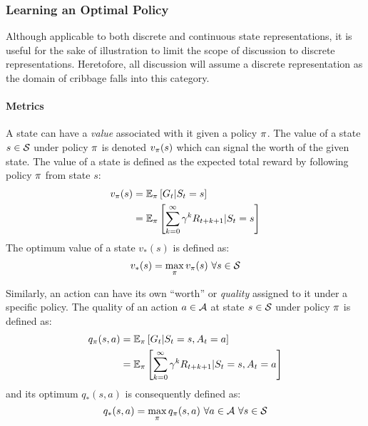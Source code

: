 \subsubsection*{Learning an Optimal Policy}


%
Although applicable to both discrete and continuous state representations,
it is useful for the sake of illustration to limit the scope of discussion to
discrete representations.
%
Heretofore, %
all discussion will assume a discrete representation
as the domain of cribbage falls into this category.

\paragraph*{Metrics}


A state can have a \textit{value} associated with it given a policy $\pi$.
%
The value of a state $s \in \mathcal{S}$ under policy $\pi$ is denoted
$v_\pi(s)$
which can signal the worth of the given state.
%
The value of a state
is defined as the expected total reward by following policy $\pi$ from
state $s$:
\begin{align*}
	v_\pi(s) &= \mathbb{E}_\pi\left[G_t | S_t = s\right] \\
		&= \mathbb{E}_\pi \left[
				\sum_{k=0}^{\infty} \gamma^k R_{t+k+1} | S_t = s
			\right]
\end{align*}
%
The optimum value of a state $v_*(s)$ is defined as:
\[ v_*(s) = \max_\pi v_\pi(s)\ \forall s \in \mathcal{S} \]

Similarly,
an action can have its own ``worth'' or \textit{quality} assigned to it under a
specific policy.
%
The quality of an action $a\in\mathcal{A}$ at state $s\in\mathcal{S}$ under policy
$\pi$ is defined as:
\begin{align*}
	q_\pi(s,a)
		&= \mathbb{E}_\pi\left[ G_t | S_t = s, A_t = a \right]
		\\
		&= \mathbb{E}_\pi\left[
				\sum_{k=0}^{\infty}\gamma^k R_{t+k+1} | S_t = s, A_t = a
			\right]
\end{align*}
and its optimum $q_*(s,a)$ is consequently defined as:
\[
	q_*(s,a) = \max_{\policy}q_\policy(s,a)\ 
		\forall a\in\Actions\ \forall s\in\States
\]

